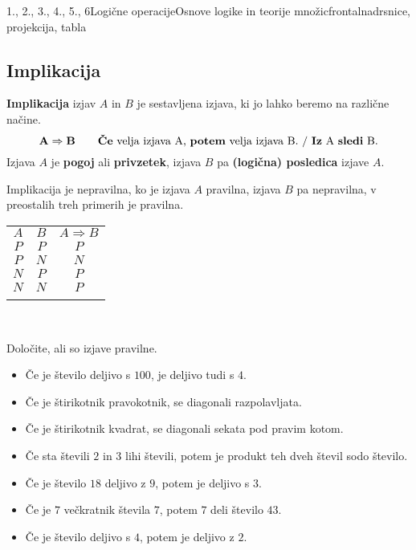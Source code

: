 \begin{priprava}{1., 2., 3., 4., 5., 6}{}{Logične operacije}{Osnove logike in teorije množic}{frontalna}{drsnice, projekcija, tabla}
   \subsection{Implikacija}
      \textbf{Implikacija} izjav $A$ in $B$ je sestavljena izjava, ki jo lahko beremo
      na različne načine.
      $$ \mathbf{A\Rightarrow B} \quad \quad \textmd{\textbf{Če} velja izjava A, 
      \textbf{potem} velja izjava B. / \textbf{Iz} A \textbf{sledi} B.}$$
      Izjava $A$ je \textbf{pogoj} ali \textbf{privzetek}, izjava $B$ pa 
      \textbf{(logična) posledica} izjave $A$.
   
            
              Implikacija je nepravilna, ko je izjava $A$ pravilna, izjava $B$ pa 
              nepravilna, v preostalih treh primerih je pravilna.
           

          \begin{table}[H]
              \centering
              \begin{tabular}{||c|c|c||} 
              \hhline{|t:===:t|}
              \rowcolor[rgb]{0.843,0.718,0.718} $A$ & $B$ & $A\Rightarrow B$  \\ 
              \hhline{|:===:|}
              $P$ & $P$ & $P$                         \\ 
              \hline
              $P$ & $N$ & $N$                         \\ 
              \hline
              $N$ & $P$ & $P$                         \\ 
              \hline
              $N$ & $N$ & $P$                         \\
              \hhline{|b:===:b|}
              \end{tabular}
          \end{table}


~

   \begin{naloga}
      Določite, ali so izjave pravilne.
      \begin{itemize}
          \item Če je število deljivo s $100$, je deljivo tudi s $4$.
          \item Če je štirikotnik pravokotnik, se diagonali razpolavljata.
          \item Če je štirikotnik kvadrat, se diagonali sekata pod pravim kotom.
          \item Če sta števili $2$ in $3$ lihi števili, potem je produkt teh dveh števil sodo število.
          \item Če je število $18$ deljivo z $9$, potem je deljivo s $3$.
          \item Če je $7$ večkratnik števila $7$, potem $7$ deli število $43$.
          \item Če je število deljivo s $4$, potem je deljivo z $2$.
      \end{itemize}
  \end{naloga}


\end{priprava}
